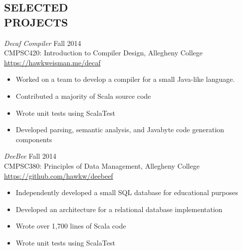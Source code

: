 \documentclass[margin]{res}
\begin{document}
\begin{resume}
                \pagebreak
\section{SELECTED \\ PROJECTS}

        {\sl Decaf Compiler} \hfill Fall 2014 \\
                CMPSC420: Introduction to Compiler Design, Allegheny College \\ 
        \url{https://hawkweisman.me/decaf}
        \begin{itemize} \itemsep -2pt %
        \item Worked on a team to develop a compiler for a small Java-like language.
        \item Contributed a majority of Scala source code
        \item Wrote unit tests using ScalaTest
        \item Developed parsing, semantic analysis, and Javabyte code generation components
        \end{itemize}
        
        {\sl DeeBee} \hfill Fall 2014 \\
                CMPSC380: Principles of Data Management, Allegheny College \\ 
        \url{https://github.com/hawkw/deebeef}
        \begin{itemize} \itemsep -2pt %
        \item Independently developed a small SQL database for educational purposes
        \item Developed an architecture for a relational database implementation
        \item Wrote over 1,700 lines of Scala code
        \item Wrote unit tests using ScalaTest
        \end{itemize}
        

\end{resume}
\end{document}
